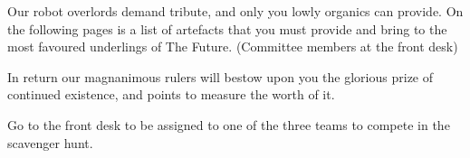 \newcommand{\team}[3]{
  \hfill
  \begin{minipage}[t]{0.3\textwidth}
    \begin{center}
      \texttt{[image: \#3]}
      \par\vspace{-0.5\baselineskip}
                 {\Large \altfont{#1}}
                 \par\vspace{-0.5\baselineskip}
                 #2
    \end{center}
  \end{minipage}
  \hfill
}


Our robot overlords demand tribute, and only you lowly organics can provide. On the following pages is a list of artefacts that you must provide and bring to the most favoured underlings of The Future. (Committee members at the front desk) 

In return our magnanimous rulers will bestow upon you the glorious prize of continued existence, and points to measure the worth of it. 

Go to the front desk to be assigned to one of the three teams to compete in the scavenger hunt. 





